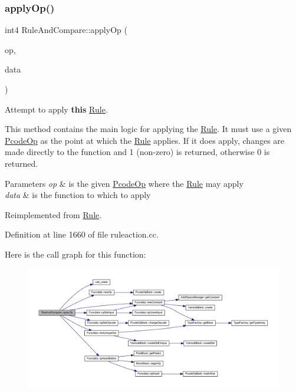 \subsubsection{\texorpdfstring{applyOp()}{applyOp()}}
{\footnotesize\ttfamily int4 Rule\+And\+Compare\+::apply\+Op (\begin{DoxyParamCaption}\item[{\mbox{\hyperlink{class_pcode_op}{Pcode\+Op}} $\ast$}]{op,  }\item[{\mbox{\hyperlink{class_funcdata}{Funcdata}} \&}]{data }\end{DoxyParamCaption})\hspace{0.3cm}{\ttfamily [virtual]}}



Attempt to apply {\bfseries{this}} \mbox{\hyperlink{class_rule}{Rule}}. 

This method contains the main logic for applying the \mbox{\hyperlink{class_rule}{Rule}}. It must use a given \mbox{\hyperlink{class_pcode_op}{Pcode\+Op}} as the point at which the \mbox{\hyperlink{class_rule}{Rule}} applies. If it does apply, changes are made directly to the function and 1 (non-\/zero) is returned, otherwise 0 is returned. 
\begin{DoxyParams}{Parameters}
{\em op} & is the given \mbox{\hyperlink{class_pcode_op}{Pcode\+Op}} where the \mbox{\hyperlink{class_rule}{Rule}} may apply \\
\hline
{\em data} & is the function to which to apply \\
\hline
\end{DoxyParams}


Reimplemented from \mbox{\hyperlink{class_rule_a4e3e61f066670175009f60fb9dc60848}{Rule}}.



Definition at line 1660 of file ruleaction.\+cc.

Here is the call graph for this function\+:
\nopagebreak
\begin{figure}[H]
\begin{center}
\leavevmode
\includegraphics[width=350pt]{class_rule_and_compare_a5bbd46f5a5c6969289ce7084c3bac4f7_cgraph}
\end{center}
\end{figure}
\mbox{\label{class_rule_and_compare_a9ae35d0a775af1e5d057c0d6cf1d4860}} 
